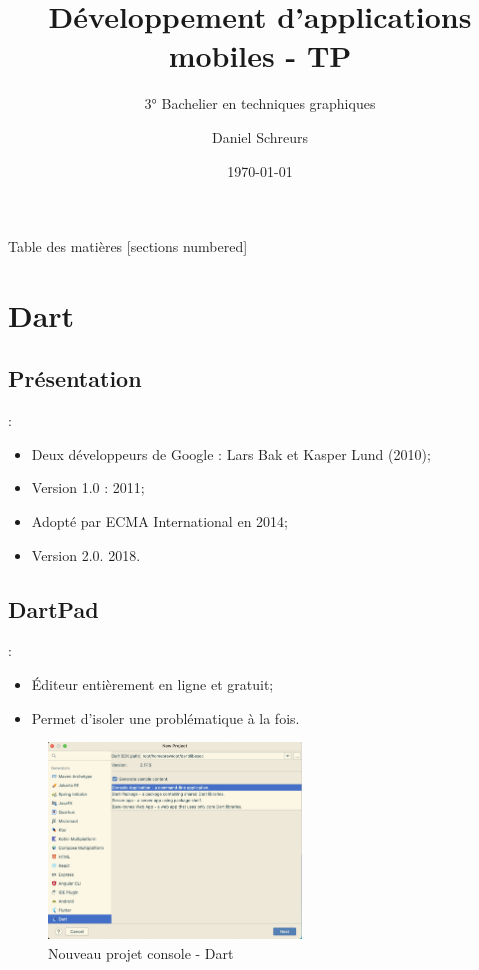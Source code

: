 \documentclass[10pt]{beamer}
\title{Développement d'applications mobiles - TP}
\subtitle{3° Bachelier en techniques graphiques}
\date{\today}
\author{Daniel Schreurs}
\institute{Haute École de la Province de Liège}
\begin{document}
\maketitle

\begin{frame}[allowframebreaks]{Table des matières}
    [sections numbered]
    \tableofcontents
\end{frame}

\section{Dart}
\subsection{Présentation}
\begin{frame}[fragile,t]{\secname : \subsecname}
    \begin{itemize}
        \item Deux développeurs de Google : Lars Bak et Kasper Lund (2010);
        \item Version 1.0 : 2011;
        \item Adopté par ECMA International en 2014;
        \item Version 2.0. 2018.
    \end{itemize}
\end{frame}

\subsection{DartPad}
\begin{frame}[fragile,t]{\secname : \subsecname}
    \begin{itemize}
        \item Éditeur entièrement en ligne et gratuit;
        \item Permet d'isoler une problématique à la fois.
    \end{itemize}
    \begin{figure}
        \begin{center}
            \includegraphics[width=0.60\textwidth]{../assets/img/new-project-1--dart.jpg}
            \caption*{Nouveau projet console - Dart}
        \end{center}
    \end{figure}
\end{frame}
\end{document}
